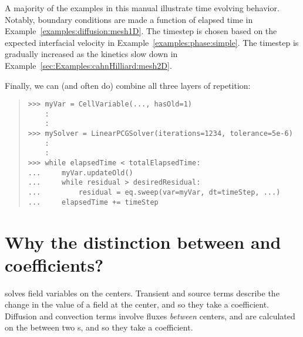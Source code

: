 \begin{description}
        A majority of the examples in this manual illustrate time
        evolving behavior. Notably, boundary conditions are made a
        function of elapsed time in
        Example~\ref{examples:diffusion:mesh1D}. The timestep is
        chosen based on the expected interfacial velocity in
        Example~\ref{examples:phase:simple}. The timestep is
        gradually increased as the kinetics slow down in
        Example~\ref{sec:Examples:cahnHilliard:mesh2D}.
    
    \end{description}
    
    Finally, we can (and often do) combine all three layers of repetition:
    \begin{quote}
\begin{verbatim}
>>> myVar = CellVariable(..., hasOld=1)
    : 
    :
>>> mySolver = LinearPCGSolver(iterations=1234, tolerance=5e-6) 
    : 
    :
>>> while elapsedTime < totalElapsedTime:
...     myVar.updateOld()
...     while residual > desiredResidual:
...         residual = eq.sweep(var=myVar, dt=timeStep, ...)
...     elapsedTime += timeStep
\end{verbatim}
    \end{quote}

    \section{Why the distinction between  and
     coefficients?}  \FiPy{} solves field
    variables on the  centers.  Transient and source terms
    describe the change in the value of a field at the 
    center, and so they take a  coefficient.
    Diffusion and convection terms involve fluxes \emph{between}
     centers, and are calculated on the 
    between two s, and so they take a 
    coefficient.
    
